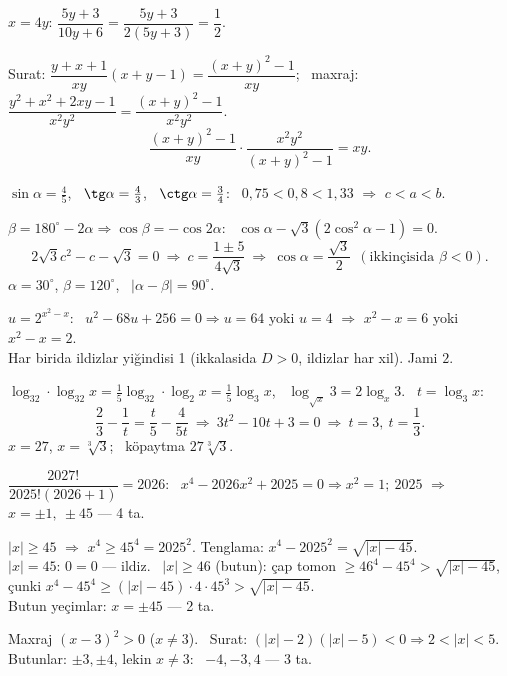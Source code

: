 $x=4y$: \quad $\dfrac{5y+3}{10y+6}=\dfrac{5y+3}{2(5y+3)}=\dfrac12$.

Surat: $\dfrac{y+x+1}{xy}(x+y-1)=\dfrac{(x+y)^2-1}{xy}$; \ maxraj: $\dfrac{y^2+x^2+2xy-1}{x^2y^2}=\dfrac{(x+y)^2-1}{x^2y^2}$.
\[\frac{(x+y)^2-1}{xy}\cdot\frac{x^2y^2}{(x+y)^2-1}=xy.\]

$\sin\alpha=\frac45$, \ $\tg\alpha=\frac43$, \ $\ctg\alpha=\frac34$: \ $0{,}75<0{,}8<1{,}33$ $\Rightarrow$ $c<a<b$.

$\beta=180^\circ-2\alpha\Rightarrow\cos\beta=-\cos2\alpha$: \ $\cos\alpha-\sqrt3(2\cos^2\alpha-1)=0$.
\[2\sqrt3c^2-c-\sqrt3=0\ \Rightarrow\ c=\frac{1\pm5}{4\sqrt3}\ \Rightarrow\ \cos\alpha=\frac{\sqrt3}2\ \ (\text{ikkinçisida }\beta<0).\]
$\alpha=30^\circ$, $\beta=120^\circ$, \ $|\alpha-\beta|=90^\circ$.

$u=2^{x^2-x}$: \ $u^2-68u+256=0\Rightarrow u=64$ yoki $u=4$ $\Rightarrow$ $x^2-x=6$ yoki $x^2-x=2$.\\
Har birida ildizlar yiğindisi 1 (ikkalasida $D>0$, ildizlar har xil). Jami $2$.

$\log_32\cdot\log_{32}x=\frac15\log_32\cdot\log_2x=\frac15\log_3x$, \ $\log_{\sqrt x}3=2\log_x3$. \ $t=\log_3x$:
\[\frac23-\frac1t=\frac t5-\frac4{5t}\ \Rightarrow\ 3t^2-10t+3=0\ \Rightarrow\ t=3,\ t=\frac13.\]
$x=27$, $x=\sqrt[3]3$; \ köpaytma $27\sqrt[3]3$.

$\dfrac{2027!}{2025!(2026+1)}=2026$: \ $x^4-2026x^2+2025=0\Rightarrow x^2=1;\ 2025$ $\Rightarrow$ $x=\pm1,\ \pm45$ — 4 ta.

$|x|\ge45$ $\Rightarrow$ $x^4\ge45^4=2025^2$. Tenglama: $x^4-2025^2=\sqrt{|x|-45}$.\\
$|x|=45$: $0=0$ — ildiz. \ $|x|\ge46$ (butun): çap tomon $\ge46^4-45^4>\sqrt{|x|-45}$, çunki $x^4-45^4\ge(|x|-45)\cdot4\cdot45^3>\sqrt{|x|-45}$.\\
Butun yeçimlar: $x=\pm45$ — 2 ta.

Maxraj $(x-3)^2>0$ ($x\ne3$). \ Surat: $(|x|-2)(|x|-5)<0\Rightarrow2<|x|<5$.\\
Butunlar: $\pm3,\pm4$, lekin $x\ne3$: \ $-4,-3,4$ — 3 ta.

